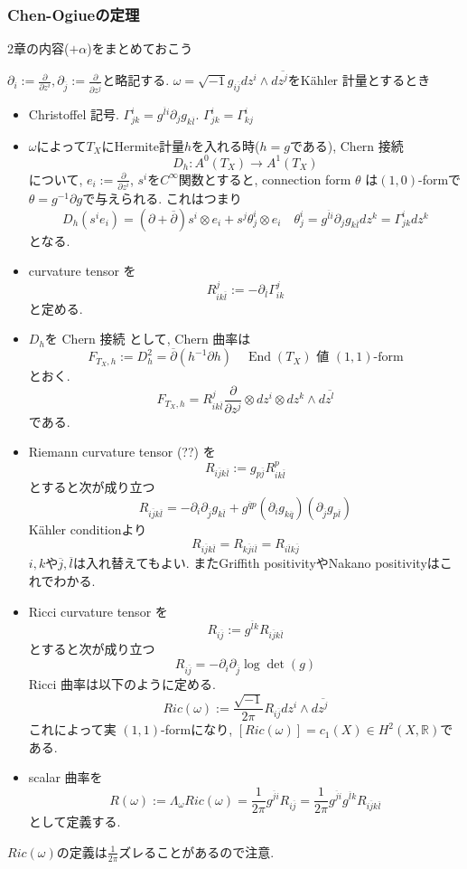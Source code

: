 \documentclass[dvipdfmx,a4paper,11pt]{article} %
\theoremstyle{definition}
\theoremstyle{remark}
\numberwithin{equation}{section}
\newcommand{\End}[0]{\operatorname{End}}
\newcommand{\R}{\mathbb{R}}
\begin{document}
\subsubsection{Chen-Ogiueの定理}
2章の内容($+\alpha$)をまとめておこう　
\begin{tcolorbox}[mybox]
$\partial_{i}:=\frac{\partial}{\partial z^{i}}, \partial_{\overline j }:=\frac{\partial}{\partial \overline{z^j}}$と略記する. 
$\omega=\sqrt{-1}g_{i \overline{j}} dz^i \wedge d \overline{z^j}$をKähler 計量とするとき
\begin{itemize}
\item Christoffel 記号. $\Gamma_{jk}^{i} = g^{\overline{l}i} \partial_j g_{k\overline{l}} $. $\Gamma_{jk}^{i} = \Gamma_{kj}^{i}$
\item $\omega$によって$T_X$にHermite計量$h$を入れる時($h=g$である), Chern 接続 
$$
D_h : A^0(T_X) \to A^{1}(T_X)
$$
について, $e_i:=\frac{\partial}{\partial z^i}$, $s^i$を$C^\infty$関数とすると, connection form $\theta$ は$(1,0)$-formで$\theta=g^{-1} \partial g$で与えられる. これはつまり
$$
D_h (s^i e_i) = (\partial + \overline{\partial})s^i \otimes e_i + s^j \theta^{i}_{j} \otimes e_i
\quad
\theta^{i}_{j} = g^{\overline{l}i}\partial_j g_{k \overline{l}} dz^k =\Gamma_{jk}^{i} dz^k
$$
となる. 
\item curvature tensor を
$$
R^{j}_{i k \overline{l}}:= - \partial_{\overline{l}}\Gamma^{j}_{ik}
$$
と定める. 
\item  $D_h$を Chern 接続 として, 
Chern 曲率は
\[
F_{T_X,h} := D_{h}^{2}=\overline{\partial}(h^{-1}\partial h)
\quad \text{\(\End(T_X)\) 値 \((1,1)\)-form}
\]
とおく. 
$$
F_{T_X,h} =R^{j}_{i k \overline{l}}
\frac{\partial}{\partial z^{j}}\otimes dz^i \otimes dz^k \wedge d \overline{z^l}
$$
である. 
\item Riemann curvature tensor (??) を
$$
R_{i \overline{j}k \overline{l}}:= g_{p\overline{j}} R^{p}_{i k \overline{l}}
$$とすると次が成り立つ
$$
R_{i \overline{j}k \overline{l}} = -\partial_i \partial_{\overline{j}} g_{k \overline{l}}
+g^{\overline{q}p}(\partial_i g_{k \overline{q}})(\partial_{\overline{j}}g_{p\overline{l}})
$$
Kähler conditionより
$$
R_{i \overline{j}k \overline{l}} = 
R_{k \overline{j}i \overline{l}} = 
R_{i \overline{l}k \overline{j}} 
$$
$i,k$や$\overline{j}, \overline{l}$は入れ替えてもよい. またGriffith positivityやNakano positivityはこれでわかる.
\item Ricci curvature tensor を
$$
R_{i\overline{j}}:=g^{\overline{l}k}R_{i \overline{j}k \overline{l}} 
$$
とすると次が成り立つ
$$
R_{i \overline{j}} = -\partial_i \partial_{\overline{j}} \log \det(g)
$$
Ricci 曲率は以下のように定める. 
$$
Ric(\omega):= \frac{\sqrt{-1}}{2 \pi} R_{i\overline{j}}dz^i \wedge d \overline{z^j}
$$
これによって実 \((1,1)\)-formになり, 
$[Ric(\omega)]=c_1(X) \in H^{2}(X, \R)$である. 
\item scalar 曲率を
$$
R(\omega):=\Lambda_{\omega} Ric(\omega)
 = \frac{1}{2\pi}g^{\overline{j}i}R_{i \overline{j}}
 =\frac{1}{2\pi}g^{\overline{j}i}g^{\overline{l}k}R_{i \overline{j}k \overline{l}} 
$$
として定義する. 
\end{itemize}
\end{tcolorbox}
$Ric(\omega)$の定義は$\frac{1}{2\pi}$ズレることがあるので注意. 
\end{document}
